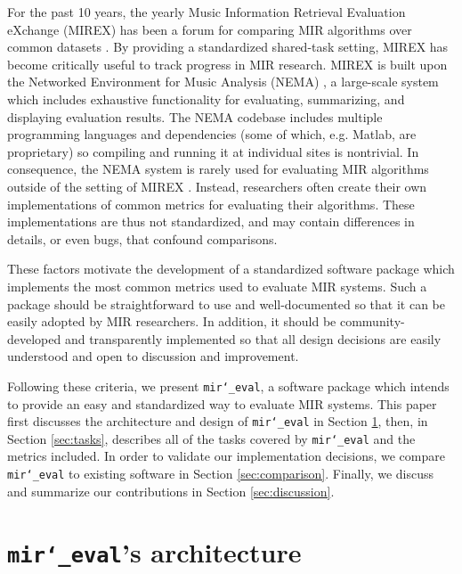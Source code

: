 \documentclass{article}
\def\mireval{\texttt{mir\char`_eval}}
\begin{document}
For the past 10 years, the yearly Music Information Retrieval Evaluation eXchange (MIREX) has been a forum for comparing MIR algorithms over common datasets \cite{downie2008music}.
By providing a standardized shared-task setting, MIREX has become critically useful to track progress in MIR research.
MIREX is built upon the Networked Environment for Music Analysis (NEMA) \cite{west2010networked}, a large-scale system which includes exhaustive functionality for evaluating, summarizing, and displaying evaluation results.
The NEMA codebase includes multiple programming languages and dependencies (some of which, e.g. Matlab, are proprietary) so compiling and running it at individual sites is nontrivial. 
%
In consequence, the NEMA system is rarely used for evaluating MIR algorithms outside of the setting of MIREX \cite{downie2008music}.
Instead, researchers often create their own implementations of common metrics for evaluating their algorithms.
These implementations are thus not standardized, and may contain differences in details, or even bugs, that confound comparisons.

These factors motivate the development of a standardized software package which implements the most common metrics used to evaluate MIR systems.
Such a package should be straightforward to use and well-documented so that it can be easily adopted by MIR researchers.
In addition, it should be community-developed and transparently implemented so that all design decisions are easily understood and open to discussion and improvement.

Following these criteria, we present \mireval{}, a software package which intends to provide an easy and standardized way to evaluate MIR systems.
This paper first discusses the architecture and design of \mireval{} in Section \ref{sec:architecture}, then, in Section \ref{sec:tasks}, describes all of the tasks covered by \mireval{} and the metrics included.
In order to validate our implementation decisions, we compare \mireval{} to existing software in Section \ref{sec:comparison}.
Finally, we discuss and summarize our contributions in Section \ref{sec:discussion}.

\section{\mireval{}'s architecture}
\label{sec:architecture}
\end{document}
